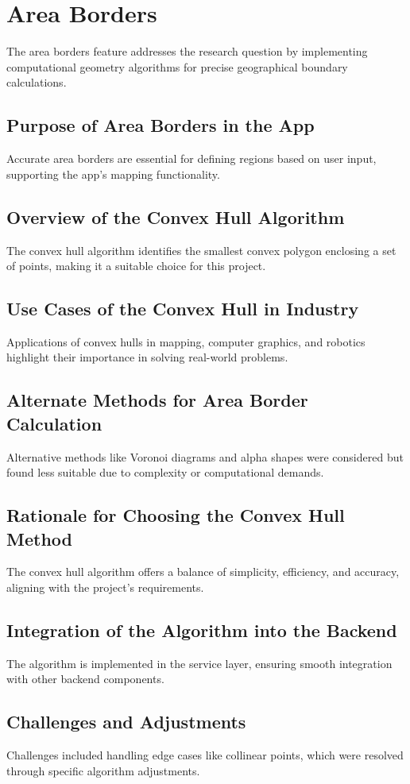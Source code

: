 \Author{\daAuthorThree}

\usepackage{amsmath}



    \section{Area Borders}
    The area borders feature addresses the research question by implementing computational geometry algorithms for precise geographical boundary calculations.

    \subsection{Purpose of Area Borders in the App}
    Accurate area borders are essential for defining regions based on user input, supporting the app's mapping functionality.

    \subsection{Overview of the Convex Hull Algorithm}
    The convex hull algorithm identifies the smallest convex polygon enclosing a set of points, making it a suitable choice for this project.

    \subsection{Use Cases of the Convex Hull in Industry}
    Applications of convex hulls in mapping, computer graphics, and robotics highlight their importance in solving real-world problems.

    \subsection{Alternate Methods for Area Border Calculation}
    Alternative methods like Voronoi diagrams and alpha shapes were considered but found less suitable due to complexity or computational demands.

    \subsection{Rationale for Choosing the Convex Hull Method}
    The convex hull algorithm offers a balance of simplicity, efficiency, and accuracy, aligning with the project's requirements.

    \subsection{Integration of the Algorithm into the Backend}
    The algorithm is implemented in the service layer, ensuring smooth integration with other backend components.

    \subsection{Challenges and Adjustments}
    Challenges included handling edge cases like collinear points, which were resolved through specific algorithm adjustments.

